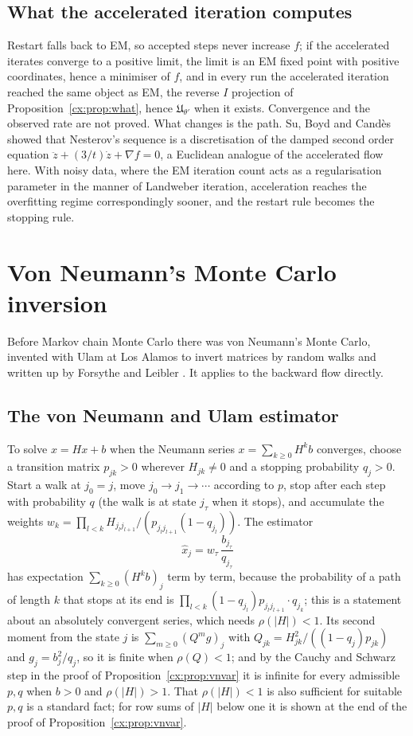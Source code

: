 \subsection{What the accelerated iteration computes}

Restart falls back to EM, so accepted steps never increase $f$; if the accelerated iterates converge to a positive limit, the limit is an EM fixed point with positive coordinates, hence a minimiser of $f$, and in every run the accelerated iteration reached the same object as EM, the reverse $I$ projection of Proposition~\ref{cx:prop:what}, hence $\mathfrak U_{\theta'}$ when it exists. Convergence and the observed rate are not proved. What changes is the path. Su, Boyd and Cand\`es \cite{SBC16} showed that Nesterov's sequence is a discretisation of the damped second order equation $\ddot z+(3/t)\dot z+\nabla f=0$, a Euclidean analogue of the accelerated flow here. With noisy data, where the EM iteration count acts as a regularisation parameter in the manner of Landweber iteration, acceleration reaches the overfitting regime correspondingly sooner, and the restart rule becomes the stopping rule.

\section{Von Neumann's Monte Carlo inversion}\label{cx:sec:vnmc}

Before Markov chain Monte Carlo there was von Neumann's Monte Carlo, invented with Ulam at Los Alamos to invert matrices by random walks and written up by Forsythe and Leibler \cite{FL50}. It applies to the backward flow directly.

\subsection{The von Neumann and Ulam estimator}

To solve $x=Hx+b$ when the Neumann series $x=\sum_{k\ge0}H^kb$ converges, choose a transition matrix $p_{jk}>0$ wherever $H_{jk}\ne0$ and a stopping probability $q_j>0$. Start a walk at $j_0=j$, move $j_0\to j_1\to\cdots$ according to $p$, stop after each step with probability $q$ (the walk is at state $j_\tau$ when it stops), and accumulate the weights $w_k=\prod_{l<k}H_{j_lj_{l+1}}/(p_{j_lj_{l+1}}(1-q_{j_l}))$. The estimator
\[
\widehat x_j=w_\tau\,\frac{b_{j_\tau}}{q_{j_\tau}}
\]
has expectation $\sum_{k\ge0}(H^kb)_j$ term by term, because the probability of a path of length $k$ that stops at its end is $\prod_{l<k}(1-q_{j_l})p_{j_lj_{l+1}}\cdot q_{j_k}$; this is a statement about an absolutely convergent series, which needs $\rho(|H|)<1$. Its second moment from the state $j$ is $\sum_{m\ge0}(Q^mg)_j$ with $Q_{jk}=H_{jk}^2/((1-q_j)p_{jk})$ and $g_j=b_j^2/q_j$, so it is finite when $\rho(Q)<1$; and by the Cauchy and Schwarz step in the proof of Proposition~\ref{cx:prop:vnvar} it is infinite for every admissible $p,q$ when $b>0$ and $\rho(|H|)>1$. That $\rho(|H|)<1$ is also sufficient for suitable $p,q$ is a standard fact; for row sums of $|H|$ below one it is shown at the end of the proof of Proposition~\ref{cx:prop:vnvar}.

